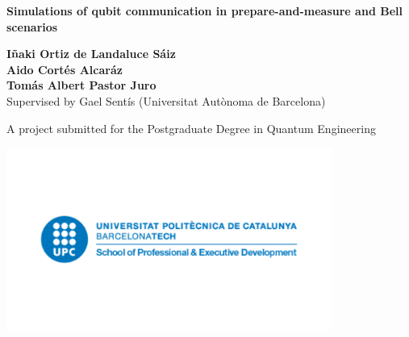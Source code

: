 \begin{titlepage}
   \begin{center}
       \vspace*{1cm}

       \Large
       \textbf{Simulations of qubit communication in prepare-and-measure and Bell scenarios}

       \vspace{0.8cm}

       \normalsize
       \textbf{I\~{n}aki Ortiz de Landaluce S\'aiz\\Aido Cort\'es Alcar\'az\\Tom\'as Albert Pastor Juro\\}
       \vspace{0.5cm}
       \footnotesize{Supervised by Gael Sent\'is (Universitat Aut\`onoma de Barcelona)}
       \vfill
            
       \footnotesize{A project submitted for the Postgraduate Degree in Quantum Engineering}
            
       \includegraphics[width=0.8\textwidth]{images/upc.png}
            
       \date{\today}
            
   \end{center}
\end{titlepage}
